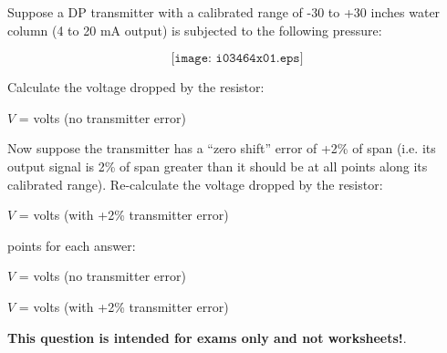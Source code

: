 

Suppose a DP transmitter with a calibrated range of -30 to +30 inches water column (4 to 20 mA output) is subjected to the following pressure:

$$\texttt{[image: i03464x01.eps]}$$

Calculate the voltage dropped by the resistor:

\vskip 10pt

$V$ = \underbar{\hskip 50pt} volts (no transmitter error)

\vskip 30pt

Now suppose the transmitter has a ``zero shift'' error of +2\% of span (i.e. its output signal is 2\% of span greater than it should be at all points along its calibrated range).  Re-calculate the voltage dropped by the resistor:

\vskip 10pt

$V$ = \underbar{\hskip 50pt} volts (with +2\% transmitter error)







 points for each answer:

\vskip 10pt

$V$ =  volts (no transmitter error)

$V$ =  volts (with +2\% transmitter error)







{\bf This question is intended for exams only and not worksheets!}.



